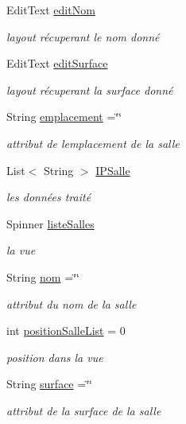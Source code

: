 \begin{DoxyCompactItemize}
Edit\+Text \hyperlink{classcom_1_1lasalle_1_1meeting_1_1_configuration_salle_activity_a79f6eb0127fb0182880b9f1eefda39c8}{edit\+Nom}
\begin{DoxyCompactList}\small\item\em layout récuperant le nom donné \end{DoxyCompactList}\item 
Edit\+Text \hyperlink{classcom_1_1lasalle_1_1meeting_1_1_configuration_salle_activity_a75bd76c0944c831ff00668299d8db929}{edit\+Surface}
\begin{DoxyCompactList}\small\item\em layout récuperant la surface donné \end{DoxyCompactList}\item 
String \hyperlink{classcom_1_1lasalle_1_1meeting_1_1_configuration_salle_activity_aeaee855a9fd72ad17519c287f2dcc322}{emplacement} =\char`\"{}\char`\"{}
\begin{DoxyCompactList}\small\item\em attribut de l\textquotesingle{}emplacement de la salle \end{DoxyCompactList}\item 
List$<$ String $>$ \hyperlink{classcom_1_1lasalle_1_1meeting_1_1_configuration_salle_activity_a74bb868ae39746bae6533c1735207abf}{I\+P\+Salle}
\begin{DoxyCompactList}\small\item\em les données traité \end{DoxyCompactList}\item 
Spinner \hyperlink{classcom_1_1lasalle_1_1meeting_1_1_configuration_salle_activity_ac1fa67c33882d1f181ba80a061ad097a}{liste\+Salles}
\begin{DoxyCompactList}\small\item\em la vue \end{DoxyCompactList}\item 
String \hyperlink{classcom_1_1lasalle_1_1meeting_1_1_configuration_salle_activity_ae7ae98c2c6e8e8d42260100ecc70aabc}{nom} =\char`\"{}\char`\"{}
\begin{DoxyCompactList}\small\item\em attribut du nom de la salle \end{DoxyCompactList}\item 
int \hyperlink{classcom_1_1lasalle_1_1meeting_1_1_configuration_salle_activity_ae76edfdd5b57cd474cccb830950f864a}{position\+Salle\+List} = 0
\begin{DoxyCompactList}\small\item\em position dans la vue \end{DoxyCompactList}\item 
String \hyperlink{classcom_1_1lasalle_1_1meeting_1_1_configuration_salle_activity_a3d27df453e9f461eb7402a8f69ca7ae1}{surface} =\char`\"{}\char`\"{}
\begin{DoxyCompactList}\small\item\em attribut de la surface de la salle \end{DoxyCompactList}\end{DoxyCompactItemize}
